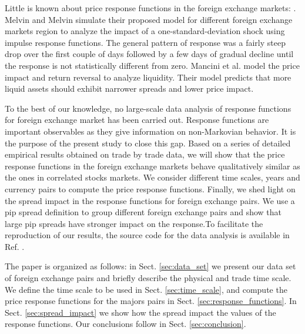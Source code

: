 Little is known about price response functions in the foreign exchange markets:
\cite{forex_liquidity,forex_volatility,response_funct_fx}. Melvin and Melvin
\cite{forex_volatility} simulate their proposed model for different foreign
exchange markets region to analyze the impact of a one-standard-deviation shock
using impulse response functions. The general pattern of response was a fairly
steep drop over the first couple of days followed by a few days of gradual
decline until the response is not statistically different from zero. Mancini et
al. \cite{forex_liquidity} model the price impact and return reversal to
analyze liquidity. Their model predicts that more liquid assets should exhibit
narrower spreads and lower price impact.

To the best of our knowledge, no large-scale data analysis of response
functions for foreign exchange market has been carried out. Response functions
are important observables as they give information on non-Markovian behavior.
It is the purpose of the present study to close this gap. Based on a series of
detailed empirical results obtained on trade by trade data, we will show that
the price response functions in the foreign exchange markets behave
qualitatively similar as the ones in correlated stocks markets. We consider
different time scales, years and currency pairs to compute the price response
functions. Finally, we shed light on the spread impact in the response
functions for foreign exchange pairs. We use a pip spread definition to group
different foreign exchange pairs and show that large pip spreads have stronger
impact on the response.To facilitate the reproduction of our results, the
source code for the data analysis is available in Ref. \cite{code}.

The paper is organized as follows: in Sect. \ref{sec:data_set} we present our
data set of foreign exchange pairs and briefly describe the physical and trade
time scale. We define the time scale to be used in Sect. \ref{sec:time_scale},
and compute the price response functions for the majors pairs in Sect.
\ref{sec:response_functions}. In Sect. \ref{sec:spread_impact} we show how
the spread impact the values of the response functions. Our conclusions follow
in Sect. \ref{sec:conclusion}.